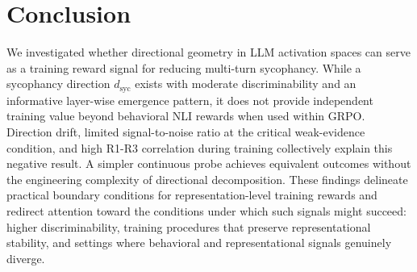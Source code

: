 \documentclass[11pt,a4paper]{article}
\newcommand{\dsyc}{$d_{\text{syc}}$}
\begin{document}
\section{Conclusion}

We investigated whether directional geometry in LLM activation spaces can serve as a training reward signal for reducing multi-turn sycophancy. While a sycophancy direction \dsyc{} exists with moderate discriminability and an informative layer-wise emergence pattern, it does not provide independent training value beyond behavioral NLI rewards when used within GRPO. Direction drift, limited signal-to-noise ratio at the critical weak-evidence condition, and high R1-R3 correlation during training collectively explain this negative result. A simpler continuous probe achieves equivalent outcomes without the engineering complexity of directional decomposition. These findings delineate practical boundary conditions for representation-level training rewards and redirect attention toward the conditions under which such signals might succeed: higher discriminability, training procedures that preserve representational stability, and settings where behavioral and representational signals genuinely diverge.



\end{document}
